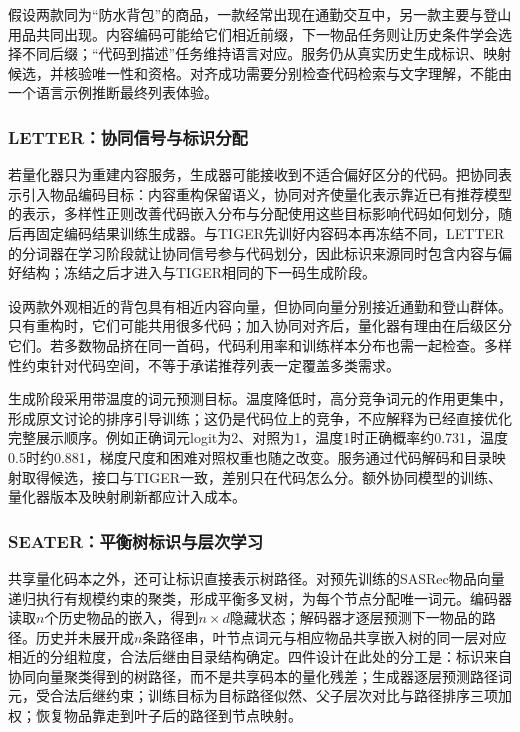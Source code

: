 假设两款同为“防水背包”的商品，一款经常出现在通勤交互中，另一款主要与登山用品共同出现。内容编码可能给它们相近前缀，下一物品任务则让历史条件学会选择不同后缀；“代码到描述”任务维持语言对应。服务仍从真实历史生成标识、映射候选，并核验唯一性和资格。对齐成功需要分别检查代码检索与文字理解，不能由一个语言示例推断最终列表体验。

\subsubsection{LETTER：协同信号与标识分配}
\label{sec:rs-letter}

若量化器只为重建内容服务，生成器可能接收到不适合偏好区分的代码。把协同表示引入物品编码目标：内容重构保留语义，协同对齐使量化表示靠近已有推荐模型的表示，多样性正则改善代码嵌入分布与分配使用这些目标影响代码如何划分，随后再固定编码结果训练生成器。与TIGER先训好内容码本再冻结不同，LETTER的分词器在学习阶段就让协同信号参与代码划分，因此标识来源同时包含内容与偏好结构；冻结之后才进入与TIGER相同的下一码生成阶段。

设两款外观相近的背包具有相近内容向量，但协同向量分别接近通勤和登山群体。只有重构时，它们可能共用很多代码；加入协同对齐后，量化器有理由在后级区分它们。若多数物品挤在同一首码，代码利用率和训练样本分布也需一起检查。多样性约束针对代码空间，不等于承诺推荐列表一定覆盖多类需求。

生成阶段采用带温度的词元预测目标。温度降低时，高分竞争词元的作用更集中，形成原文讨论的排序引导训练；这仍是代码位上的竞争，不应解释为已经直接优化完整展示顺序。例如正确词元logit为2、对照为1，温度1时正确概率约0.731，温度0.5时约0.881，梯度尺度和困难对照权重也随之改变。服务通过代码解码和目录映射取得候选，接口与TIGER一致，差别只在代码怎么分。额外协同模型的训练、量化器版本及映射刷新都应计入成本。

\subsubsection{SEATER：平衡树标识与层次学习}
\label{sec:rs-seater}

共享量化码本之外，还可让标识直接表示树路径。对预先训练的SASRec物品向量递归执行有规模约束的聚类，形成平衡多叉树，为每个节点分配唯一词元。编码器读取$n$个历史物品的嵌入，得到$n\times d$隐藏状态；解码器才逐层预测下一物品的路径。历史并未展开成$n$条路径串，叶节点词元与相应物品共享嵌入树的同一层对应相近的分组粒度，合法后继由目录结构确定。四件设计在此处的分工是：标识来自协同向量聚类得到的树路径，而不是共享码本的量化残差；生成器逐层预测路径词元，受合法后继约束；训练目标为目标路径似然、父子层次对比与路径排序三项加权；恢复物品靠走到叶子后的路径到节点映射。

